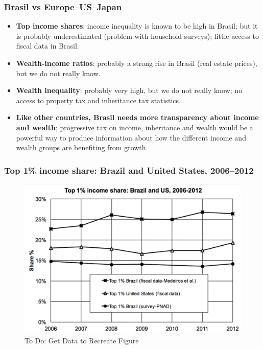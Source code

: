 \begin{frame}[label=BrasilVersus]
\frametitle{Brasil vs Europe--US--Japan}
\begin{itemize}
\item
\textbf{Top income shares}: income inequality is known to be high in Brasil; but it is probably underestimated (problem with household surveys); little access to fiscal data in Brasil.
\item 
\textbf{Wealth-income ratios}: probably a strong rise in Brasil (real estate prices), but we do not really know.
\item
\textbf{Wealth inequality}: probably very high, but we do not really know; no access to property tax and inheritance tax statistics.
\item
\textbf{Like other countries, Brasil needs more transparency about income and wealth}; progressive tax on income, inheritance and wealth would be a powerful way to produce information about how the different income and wealth groups are benefiting from growth.
\end{itemize}
\end{frame}


\begin{frame}[label=BrazilUSTop1]
\frametitle{Top 1\% income share: Brazil and United States, 2006--2012}
\begin{figure}[t]
\begin{minipage}[b]{\textwidth}
\centering
\includegraphics[width=\textwidth]
{pictures/Top1BrazilVsUSA}
\caption{To Do: Get Data to Recreate Figure}
\end{minipage}
\end{figure}
\end{frame}


